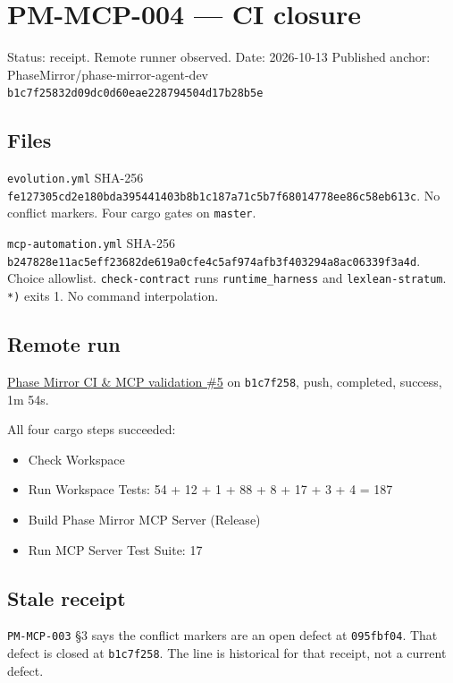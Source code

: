 \documentclass[
]{article}
\author{}
\date{}
\providecommand{\tightlist}{%
  \setlength{\itemsep}{0pt}\setlength{\parskip}{0pt}}
\begin{document}
\hypertarget{pm-mcp-004-ci-closure}{%
\section{PM-MCP-004 --- CI closure}\label{pm-mcp-004-ci-closure}}

Status: receipt. Remote runner observed. Date: 2026-10-13 Published
anchor: PhaseMirror/phase-mirror-agent-dev
\texttt{b1c7f25832d09dc0d60eae228794504d17b28b5e}

\hypertarget{files}{%
\subsection{Files}\label{files}}

\texttt{evolution.yml} SHA-256
\texttt{fe127305cd2e180bda395441403b8b1c187a71c5b7f68014778ee86c58eb613c}.
No conflict markers. Four cargo gates on \texttt{master}.

\texttt{mcp-automation.yml} SHA-256
\texttt{b247828e11ac5eff23682de619a0cfe4c5af974afb3f403294a8ac06339f3a4d}.
Choice allowlist. \texttt{check-contract} runs \texttt{runtime\_harness}
and \texttt{lexlean-stratum}. \texttt{*)} exits 1. No command
interpolation.

\hypertarget{remote-run}{%
\subsection{Remote run}\label{remote-run}}

\href{https://github.com/PhaseMirror/phase-mirror-agent-dev/actions/runs/38344783887}{Phase
Mirror CI \& MCP validation \#5} on \texttt{b1c7f258}, push, completed,
success, 1m 54s.

All four cargo steps succeeded:

\begin{itemize}
\tightlist
\item
  Check Workspace
\item
  Run Workspace Tests: 54 + 12 + 1 + 88 + 8 + 17 + 3 + 4 = 187
\item
  Build Phase Mirror MCP Server (Release)
\item
  Run MCP Server Test Suite: 17
\end{itemize}

\hypertarget{stale-receipt}{%
\subsection{Stale receipt}\label{stale-receipt}}

\texttt{PM-MCP-003} §3 says the conflict markers are an open defect at
\texttt{095fbf04}. That defect is closed at \texttt{b1c7f258}. The line
is historical for that receipt, not a current defect.
\end{document}
